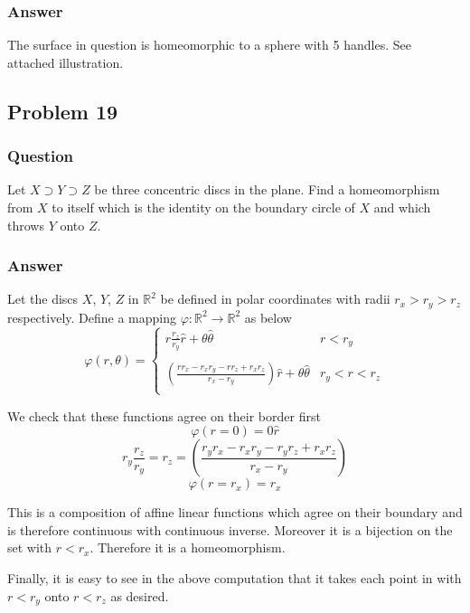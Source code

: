 \documentclass[10pt]{article}
\begin{document}
\subsubsection{Answer}
The surface in question is homeomorphic to a sphere with 5 handles. See attached illustration. 
\subsection{Problem 19}

\subsubsection{Question}
Let $X \supset Y \supset Z$ be three concentric discs in the plane. Find a homeomorphism from $X$ to itself which is the identity on the boundary circle of $X$ and which throws $Y$ onto $Z$.
\subsubsection{Answer}
Let the discs $X$, $Y$, $Z$ in $\mathbb{R}^2$ be defined in polar coordinates with radii $r_x> r_y>r_z$ respectively. Define a mapping $\varphi: \mathbb{R}^2 \to \mathbb{R}^2$ as below
\[\varphi(r,\theta) = \left\{ \begin{array}{ll}
\displaystyle r \frac{r_z}{r_y }\hat{r} + \theta \hat{\theta} &r < r_y\\ \\
\displaystyle \left( \frac{r r_x-r_x r_y-r r_z+r_x r_z}{r_x-r_y} \right) \hat{r} + \theta \hat{\theta} & r_y<r< r_z\\
\end{array} \right.\]

We check that these functions agree on their border first
\[ \varphi(r=0)=0 \hat{r} \]
\[r_y \frac{r_z}{r_y} = r_z = \left( \frac{r_y r_x-r_x r_y-r_y r_z+r_x r_z}{r_x-r_y} \right) \]
\[ \varphi(r=r_x) = r_x \]

This is a composition of affine linear functions which agree on their boundary and is therefore continuous with continuous inverse. Moreover it is a bijection on the set with $r < r_x$. Therefore it is a homeomorphism.

Finally, it is easy to see in the above computation that it takes each point in with $r<r_y$ onto $r< r_z$ as desired. 
\end{document}
